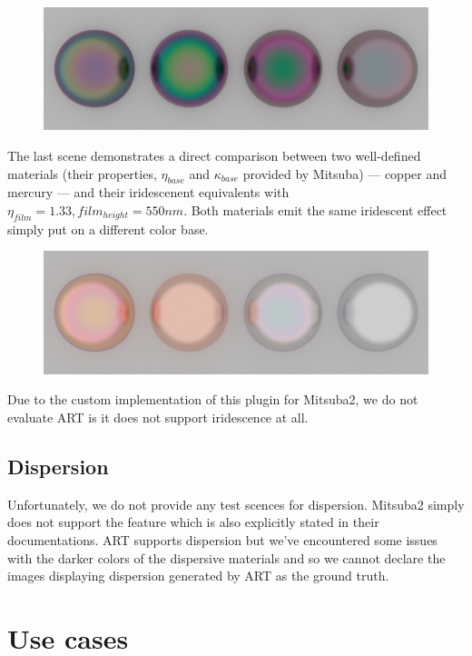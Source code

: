 \begin{description}
\begin{figure}[H]
		\centering
		\includegraphics[width=.9\linewidth]{img/iridescent_spheres_film.png}
		\caption{}
		\label{fig:irid_ior}
	\end{figure}
	\item[Materials~\ref{fig:irid_mat}] The last scene demonstrates a direct comparison between two well-defined materials (their properties, $\eta_{base}$ and $\kappa_{base}$ provided by Mitsuba) --- copper and mercury --- and their iridescenent equivalents with $\eta_{film}=1.33,film_{height}=550nm$. Both materials emit the same iridescent effect simply put on a  different color base.
	\begin{figure}[H]
		\centering
		\includegraphics[width=.9\linewidth]{img/iridescent_spheres_materials.png}
		\caption{}
		\label{fig:irid_mat}
	\end{figure}
\end{description}

Due to the custom implementation of this plugin for Mitsuba2, we do not evaluate ART is it does not support iridescence at all.

\subsection{Dispersion}

Unfortunately, we do not provide any test scences for dispersion. Mitsuba2 simply does not support the feature which is also explicitly stated in their documentations. ART supports dispersion but we've encountered some issues with the darker colors of the dispersive materials and so we cannot declare the images displaying dispersion generated by ART as the ground truth.

\section{Use cases}

